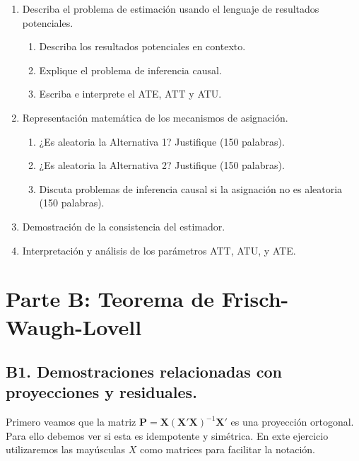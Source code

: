 \documentclass[12pt, letter]{article}
\begin{document}
\begin{enumerate}[label=A.\arabic*]
    \item Describa el problema de estimación usando el lenguaje de resultados potenciales.
    \begin{enumerate}[label=A.1.\alph*]
        \item Describa los resultados potenciales en contexto.
        \item Explique el problema de inferencia causal.
        \item Escriba e interprete el ATE, ATT y ATU.
    \end{enumerate}


    \item Representación matemática de los mecanismos de asignación.
    \begin{enumerate}[label=A.2.\alph*]
        \item ¿Es aleatoria la Alternativa 1? Justifique (150 palabras).
        \item ¿Es aleatoria la Alternativa 2? Justifique (150 palabras).
        \item Discuta problemas de inferencia causal si la asignación no es aleatoria (150 palabras).
    \end{enumerate}
    \item Demostración de la consistencia del estimador.
    \item Interpretación y análisis de los parámetros ATT, ATU, y ATE.
\end{enumerate}







                                 
                                
\section{Parte B: Teorema de Frisch-Waugh-Lovell}
\subsection{B1. Demostraciones relacionadas con proyecciones y residuales.}

Primero veamos que la matriz $\textbf{P} = \textbf{X}(\textbf{X}'\textbf{X})^{-1}\textbf{X}'$ es una proyección ortogonal. Para ello debemos ver si esta es idempotente y simétrica. En exte ejercicio utilizaremos las mayúsculas $X$ como matrices para facilitar la notación. 
\end{document}

